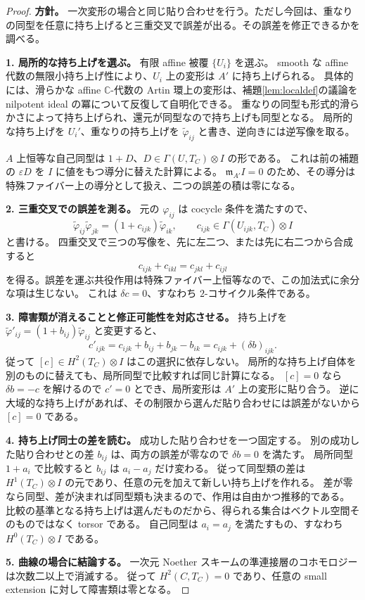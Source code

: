\documentclass[dvipdfmx,a4paper,11pt]{article}
\theoremstyle{definition}
\newcommand{\C}{\mathbb C}\newcommand{\R}{\mathbb R}\newcommand{\Z}{\mathbb Z}\newcommand{\Q}{\mathbb Q}
\newcommand{\eps}{\varepsilon}
\begin{document}
\begin{proof}
\textbf{方針。} 一次変形の場合と同じ貼り合わせを行う。ただし今回は、重なりの同型を任意に持ち上げると三重交叉で誤差が出る。その誤差を修正できるかを調べる。

\textbf{1. 局所的な持ち上げを選ぶ。}
有限 affine 被覆 $\{U_i\}$ を選ぶ。
smooth な affine 代数の無限小持ち上げ性により、$U_i$ 上の変形は $A'$ に持ち上げられる。
具体的には、滑らかな affine $\C$-代数の Artin 環上の変形は、補題\ref{lem:localdef}の議論を nilpotent ideal の冪について反復して自明化できる。
重なりの同型も形式的滑らかさによって持ち上げられ、還元が同型なので持ち上げも同型となる。
局所的な持ち上げを $U_i'$、重なりの持ち上げを $\widetilde\varphi_{ij}$ と書き、逆向きには逆写像を取る。

$A$ 上恒等な自己同型は $1+D$、$D\in\Gamma(U,T_C)\otimes I$ の形である。
これは前の補題の $\eps D$ を $I$ に値をもつ導分に替えた計算による。
$\mathfrak m_{A'}I=0$ のため、その導分は特殊ファイバー上の導分として扱え、二つの誤差の積は零になる。

\textbf{2. 三重交叉での誤差を測る。}
元の $\varphi_{ij}$ は cocycle 条件を満たすので、
\[
\widetilde\varphi_{ij}\widetilde\varphi_{jk}
=(1+c_{ijk})\widetilde\varphi_{ik},\qquad
c_{ijk}\in\Gamma(U_{ijk},T_C)\otimes I
\]
と書ける。
四重交叉で三つの写像を、先に左二つ、または先に右二つから合成すると
\[
c_{ijk}+c_{ikl}=c_{jkl}+c_{ijl}
\]
を得る。誤差を運ぶ共役作用は特殊ファイバー上恒等なので、この加法式に余分な項は生じない。
これは $\delta c=0$、すなわち $2$-コサイクル条件である。

\textbf{3. 障害類が消えることと修正可能性を対応させる。}
持ち上げを $\widetilde\varphi'_{ij}=(1+b_{ij})\widetilde\varphi_{ij}$ と変更すると、
\[
c'_{ijk}=c_{ijk}+b_{ij}+b_{jk}-b_{ik}=c_{ijk}+(\delta b)_{ijk}.
\]
従って $[c]\in H^2(T_C)\otimes I$ はこの選択に依存しない。
局所的な持ち上げ自体を別のものに替えても、局所同型で比較すれば同じ計算になる。
$[c]=0$ なら $\delta b=-c$ を解けるので $c'=0$ とでき、局所変形は $A'$ 上の変形に貼り合う。
逆に大域的な持ち上げがあれば、その制限から選んだ貼り合わせには誤差がないから $[c]=0$ である。

\textbf{4. 持ち上げ同士の差を読む。}
成功した貼り合わせを一つ固定する。
別の成功した貼り合わせとの差 $b_{ij}$ は、両方の誤差が零なので $\delta b=0$ を満たす。
局所同型 $1+a_i$ で比較すると $b_{ij}$ は $a_i-a_j$ だけ変わる。
従って同型類の差は $H^1(T_C)\otimes I$ の元であり、任意の元を加えて新しい持ち上げを作れる。
差が零なら同型、差が決まれば同型類も決まるので、作用は自由かつ推移的である。
比較の基準となる持ち上げは選んだものだから、得られる集合はベクトル空間そのものではなく torsor である。
自己同型は $a_i=a_j$ を満たすもの、すなわち $H^0(T_C)\otimes I$ である。

\textbf{5. 曲線の場合に結論する。}
一次元 Noether スキームの準連接層のコホモロジーは次数二以上で消滅する。
従って $H^2(C,T_C)=0$ であり、任意の small extension に対して障害類は零となる。
\end{proof}
\end{document}

